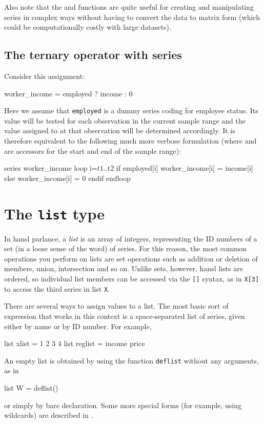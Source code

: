 Also note that the  and  functions are quite
useful for creating and manipulating series in complex ways without
having to convert the data to matrix form (which could be
computationally costly with large datasets).

\subsection{The ternary operator with series}

Consider this assignment:

\begin{code}
  worker_income = employed ? income : 0
\end{code}

Here we assume that \texttt{employed} is a dummy series coding for
employee status. Its value will be tested for each observation in the
current sample range and the value assigned to 
at that observation will be determined accordingly. It is therefore
equivalent to the following much more verbose formulation (where
 and  are accessors for the start and end of the
sample range):
\begin{code}
series worker_income
loop i=$t1..$t2
    if employed[i]
        worker_income[i] = income[i]
    else
        worker_income[i] = 0
    endif
endloop
\end{code}

\section{The \texttt{list} type}
\label{sec:lists}
 
In hansl parlance, a \textit{list} is an array of integers,
representing the ID numbers of a set (in a loose sense of the word) of
series.  For this reason, the most common operations you perform on
lists are set operations such as addition or deletion of members,
union, intersection and so on. Unlike sets, however, hansl lists are
ordered, so individual list members can be accessed via the
\texttt{[]} syntax, as in \texttt{X[3]} to access the third series in
list \texttt{X}.

There are several ways to assign values to a list.  The most basic
sort of expression that works in this context is a space-separated
list of series, given either by name or by ID number.  For example,
\begin{code}
list xlist = 1 2 3 4
list reglist = income price 
\end{code}
An empty list is obtained by using the function \texttt{deflist}
without any arguments, as in
\begin{code}
list W = deflist()  
\end{code}
or simply by bare declaration. Some more special forms (for example,
using wildcards) are described in \GUG.


